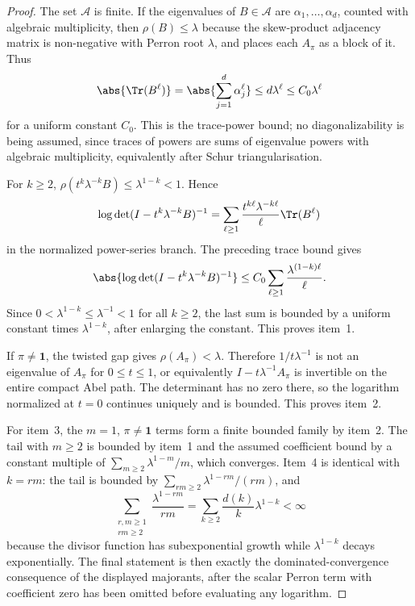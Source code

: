 \begin{proof}
  The set \(\mathscr A\) is finite. If the eigenvalues of
  \(B\in\mathscr A\) are \(\alpha_1,\ldots,\alpha_d\), counted with
  algebraic multiplicity, then
  \(\rho(B)\le\lambda\) because the skew-product adjacency matrix is
  non-negative with Perron root \(\lambda\), and
   places each
  \(A_\pi\) as a block of it. Thus
  \[
    \abs{\Tr(B^\ell)}
    =\abs{\sum_{j=1}^d\alpha_j^\ell}
    \le d\lambda^\ell
    \le C_0\lambda^\ell
  \]
  for a uniform constant \(C_0\). This is the trace-power bound; no
  diagonalizability is being assumed, since traces of powers are sums of
  eigenvalue powers with algebraic multiplicity, equivalently after Schur
  triangularisation.

  For \(k\ge2\),
  \(\rho(t^k\lambda^{-k}B)\le\lambda^{1-k}<1\). Hence
  \[
    \log\det(I-t^k\lambda^{-k}B)^{-1}
    =\sum_{\ell\ge1}
      \frac{t^{k\ell}\lambda^{-k\ell}}{\ell}\Tr(B^\ell)
  \]
  in the normalized power-series branch. The preceding trace bound gives
  \[
    \abs{\log\det(I-t^k\lambda^{-k}B)^{-1}}
    \le C_0\sum_{\ell\ge1}\frac{\lambda^{(1-k)\ell}}{\ell}.
  \]
  Since \(0<\lambda^{1-k}\le\lambda^{-1}<1\) for all \(k\ge2\), the last
  sum is bounded by a uniform constant times \(\lambda^{1-k}\), after
  enlarging the constant. This proves item~1.

  If \(\pi\neq\mathbf1\), the twisted gap gives
  \(\rho(A_\pi)<\lambda\). Therefore
  \(1/t\lambda^{-1}\) is not an eigenvalue of \(A_\pi\) for
  \(0\le t\le1\), or equivalently \(I-t\lambda^{-1}A_\pi\) is invertible
  on the entire compact Abel path. The determinant has no zero there, so
  the logarithm normalized at \(t=0\) continues uniquely and is bounded.
  This proves item~2.

  For item~3, the \(m=1\), \(\pi\neq\mathbf1\) terms form a finite bounded
  family by item~2. The tail with \(m\ge2\) is bounded by item~1 and the
  assumed coefficient bound by a constant multiple of
  \(\sum_{m\ge2}\lambda^{1-m}/m\), which converges. Item~4 is identical
  with \(k=rm\): the tail is bounded by
  \(\sum_{rm\ge2}\lambda^{1-rm}/(rm)\), and
  \[
    \sum_{\substack{r,m\ge1\\rm\ge2}}\frac{\lambda^{1-rm}}{rm}
    =\sum_{k\ge2}\frac{d(k)}{k}\lambda^{1-k}<\infty
  \]
  because the divisor function has subexponential growth while
  \(\lambda^{1-k}\) decays exponentially. The final statement is then
  exactly the dominated-convergence consequence of the displayed
  majorants, after the scalar Perron term with coefficient zero has been
  omitted before evaluating any logarithm.
\end{proof}

